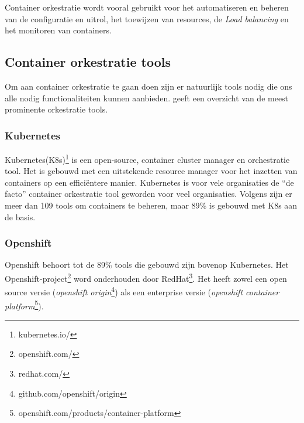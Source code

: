 Container orkestratie wordt vooral gebruikt voor het automatiseren en beheren van de configuratie en uitrol, het toewijzen van resources, de \textit{Load balancing} en het monitoren van containers.

\subsection{Container orkestratie tools}
Om aan container orkestratie te gaan doen zijn er natuurlijk tools nodig die ons alle nodig functionaliteiten kunnen aanbieden. \textcite{DevopsCube2021} geeft een overzicht van de meest prominente orkestratie tools.

\subsubsection{Kubernetes}
Kubernetes(K8s)\footnote{kubernetes.io/} is een open-source, container cluster manager en orchestratie tool. Het is gebouwd met een uitstekende resource manager voor het inzetten van containers op een efficiëntere manier. Kubernetes is voor vele organisaties de ``de facto'' container orkestratie tool geworden voor veel organisaties. Volgens \textcite{CNCF2021} zijn er meer dan 109 tools om containers te beheren, maar 89\% is gebouwd met K8s aan de basis.

\subsubsection{Openshift}
Openshift behoort tot de 89\% tools die gebouwd zijn bovenop Kubernetes. Het Openshift-project\footnote{openshift.com/} word onderhouden door RedHat\footnote{redhat.com/}. Het heeft zowel een open source versie (\textit{openshift origin}\footnote{github.com/openshift/origin}) als een enterprise versie (\textit{openshift container platform}\footnote{openshift.com/products/container-platform}).

